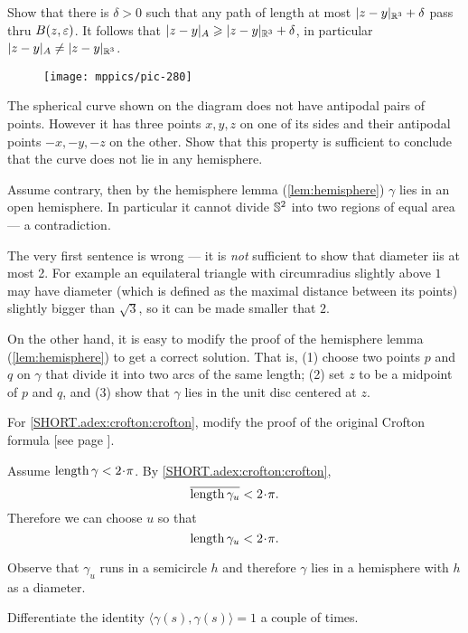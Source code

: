 Show that there is $\delta>0$ such that any path of length at most $|z-y|_{\mathbb{R}^3}+\delta$ pass thru $B(z,\varepsilon)$.
It follows that $|z-y|_A\geqslant |z-y|_{\mathbb{R}^3}+\delta$, 
in particular$|z-y|_A\ne |z-y|_{\mathbb{R}^3}$.

\begin{wrapfigure}{r}{30 mm}
\vskip-0mm
\centering
\texttt{[image: mppics/pic-280]}
\vskip0mm
\end{wrapfigure}

The spherical curve shown on the diagram does not have antipodal pairs of points.
However it has three points $x,y,z$ on one of its sides and their antipodal points $-x,-y,-z$ on the other.
Show that this property is sufficient to conclude that the curve does not lie in any hemisphere.

Assume contrary, then by the hemisphere lemma (\ref{lem:hemisphere}) $\gamma$ lies in an open hemisphere.
In particular it cannot divide $\mathbb{S}^2$ into two regions of equal area --- a contradiction.

The very first sentence is wrong --- it is \emph{not} sufficient to show that diameter iis at most 2.
For example an equilateral triangle with circumradius slightly above $1$ may have diameter (which is defined as the maximal distance between its points) slightly bigger than $\sqrt3$, so it can be made smaller that $2$.

On the other hand, it is easy to modify the proof of the hemisphere lemma (\ref{lem:hemisphere}) to get a correct solution.
That is, (1) choose two points $p$ and $q$ on $\gamma$ that divide it into two arcs of the same length;
(2) set $z$ to be a midpoint of $p$ and $q$,
and (3) show that $\gamma$ lies in the unit disc centered at $z$.


For \ref{SHORT.adex:crofton:crofton}, modify the proof of the original Crofton formula [see page \pageref{page:crofton}].

Assume $\length \gamma<2\cdot\pi$.
By \ref{SHORT.adex:crofton:crofton},
\[\overline{\length \gamma_u}<2\cdot\pi.\]
Therefore we can choose $u$ so that 
\[\length \gamma_u<2\cdot\pi.\]

Observe that $\gamma_u$ runs in a semicircle $h$ and therefore $\gamma$ lies in a hemisphere with $h$ as a diameter.


 Differentiate the identity $\langle\gamma(s),\gamma(s)\rangle=1$ a couple of times.

